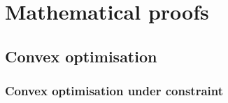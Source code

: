 \chapter{Mathematical proofs}

\section{Convex optimisation}

\subsection{Convex optimisation under constraint}